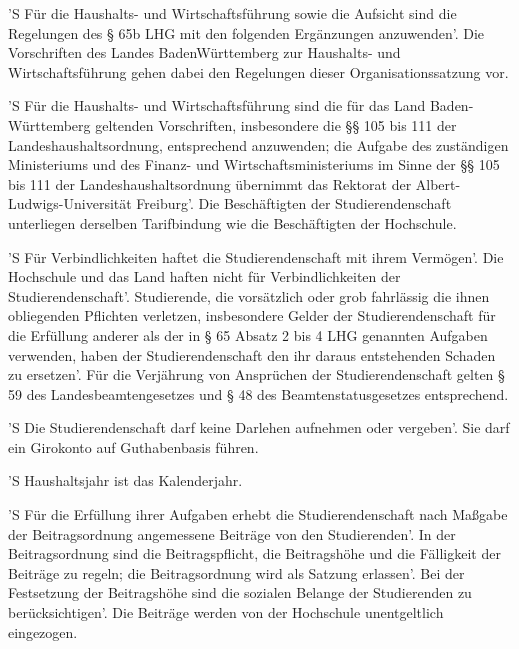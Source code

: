 \documentclass[fontsize=12pt,parskip=half]{scrartcl}
\begin{document}
\begin{contract}


  'S Für die Haushalts- und Wirtschaftsführung sowie die Aufsicht sind die
  Regelungen des § 65b LHG mit den folgenden Ergänzungen anzuwenden'. Die
  Vorschriften des Landes BadenWürttemberg zur Haushalts- und Wirtschaftsführung
  gehen dabei den Regelungen dieser Organisationssatzung vor.

  'S Für die Haushalts- und Wirtschaftsführung sind die für das Land
  Baden-Württemberg geltenden Vorschriften, insbesondere die §§ 105 bis 111 der
  Landeshaushaltsordnung, entsprechend anzuwenden; die Aufgabe des zuständigen
  Ministeriums und des Finanz- und Wirtschaftsministeriums im Sinne der §§ 105
  bis 111 der Landeshaushaltsordnung übernimmt das Rektorat der
  Albert-Ludwigs-Universität Freiburg'. Die Beschäftigten der Studierendenschaft
  unterliegen derselben Tarifbindung wie die Beschäftigten der Hochschule.

  'S Für Verbindlichkeiten haftet die Studierendenschaft mit ihrem Vermögen'. Die
  Hochschule und das Land haften nicht für Verbindlichkeiten der
  Studierendenschaft'. Studierende, die vorsätzlich oder grob fahrlässig die
  ihnen obliegenden Pflichten verletzen, insbesondere Gelder der
  Studierendenschaft für die Erfüllung anderer als der in § 65 Absatz 2 bis 4
  LHG genannten Aufgaben verwenden, haben der Studierendenschaft den ihr daraus
  entstehenden Schaden zu ersetzen'. Für die Verjährung von Ansprüchen der
  Studierendenschaft gelten § 59 des Landesbeamtengesetzes und § 48 des
  Beamtenstatusgesetzes entsprechend.

  'S Die Studierendenschaft darf keine Darlehen aufnehmen oder vergeben'. Sie darf
  ein Girokonto auf Guthabenbasis führen.



  'S Haushaltsjahr ist das Kalenderjahr.

  'S Für die Erfüllung ihrer Aufgaben erhebt die Studierendenschaft nach Maßgabe
  der Beitragsordnung angemessene Beiträge von den Studierenden'. In der
  Beitragsordnung sind die Beitragspflicht, die Beitragshöhe und die Fälligkeit
  der Beiträge zu regeln; die Beitragsordnung wird als Satzung erlassen'. Bei der
  Festsetzung der Beitragshöhe sind die sozialen Belange der Studierenden zu
  berücksichtigen'. Die Beiträge werden von der Hochschule unentgeltlich
  eingezogen.


\end{contract}
\end{document}
